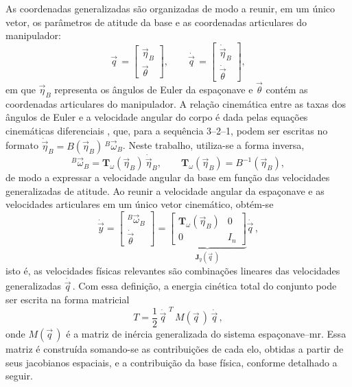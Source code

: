 As coordenadas generalizadas são organizadas de modo a reunir, em um único
vetor, os parâmetros de atitude da base e as coordenadas articulares do
manipulador:
\begin{equation}
\vec q\, 
=
\begin{bmatrix}
\vec\eta_B \\
\vec\theta
\end{bmatrix},
\qquad
\dot{\vec q\, }
=
\begin{bmatrix}
\dot{\vec\eta}_B \\
\dot{\vec\theta}
\end{bmatrix},
\label{eq:q_generalizado_base_mr}
\end{equation}
em que $\vec\eta_B $ representa os ângulos de Euler da espaçonave e
$\vec\theta$ contém as coordenadas articulares do manipulador.
A relação cinemática entre as taxas dos ângulos de Euler e a velocidade
angular do corpo é dada pelas equações cinemáticas diferenciais
\cite{Schaub2010AttitudeDynamics}, que, para a sequência 3--2--1,
podem ser escritas no formato
$\dot{\vec\eta}_B = B(\vec\eta_B)\,{}^{B}\!\vec\omega_B$.
Neste trabalho, utiliza-se a forma inversa,
\begin{equation}
    {}^{B}\!\vec\omega_B
    =
    \mathbf{T}_\omega(\vec\eta_B)\,\dot{\vec\eta}_B,
    \qquad
    \mathbf{T}_\omega(\vec\eta_B)=B^{-1}(\vec\eta_B),
\end{equation}
de modo a expressar a velocidade angular da base em função das
velocidades generalizadas de atitude.
Ao reunir a velocidade angular da espaçonave e as velocidades articulares em um
único vetor cinemático, obtém-se
\begin{equation}
    \dot{\vec y}
    =
    \begin{bmatrix}
    {}^{B}\!\vec\omega_B \\
    \dot{\vec\theta}
    \end{bmatrix}
    =
    \underbrace{
    \begin{bmatrix}
    \mathbf{T}_\omega(\vec\eta_B) & 0 \\
    0 & I_{n}
    \end{bmatrix}}_{\displaystyle \mathbf{J}_y(\vec q\, )}
    \dot{\vec q\, },
\end{equation}
isto é, as velocidades físicas relevantes são combinações lineares das
velocidades generalizadas $\dot{\vec q\, }$.
Com essa definição, a energia cinética total do conjunto pode ser escrita
na forma matricial
\begin{equation}
T =
\frac{1}{2}\,\dot{\vec q\, }^{\,T}\,M(\vec q\, )\,\dot{\vec q\, },
\label{eq:T_matriz_corrigida}
\end{equation}
onde $M(\vec q\, )$ é a matriz de inércia generalizada do sistema
espaçonave--\gls{mr}. Essa matriz é construída somando-se as contribuições
de cada elo, obtidas a partir de seus jacobianos espaciais, e a
contribuição da base física, conforme detalhado a seguir.

